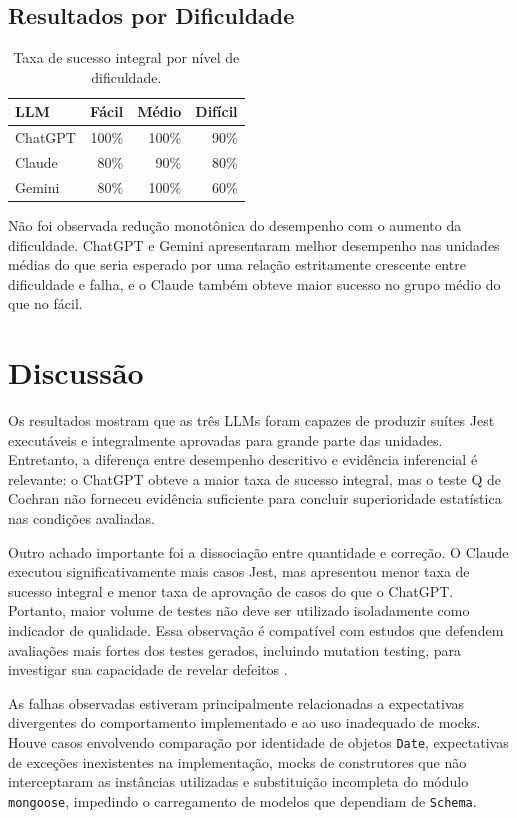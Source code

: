 \documentclass[12pt]{article}
\begin{document}
\subsection{Resultados por Dificuldade}

\begin{table}[H]
\centering
\caption{Taxa de sucesso integral por nível de dificuldade.}
\label{tab:dificuldade}
\begin{tabular}{lrrr}
\toprule
LLM & Fácil & Médio & Difícil \\
\midrule
ChatGPT & 100\% & 100\% & 90\% \\
Claude   & 80\%  & 90\%  & 80\% \\
Gemini   & 80\%  & 100\% & 60\% \\
\bottomrule
\end{tabular}
\end{table}

Não foi observada redução monotônica do desempenho com o aumento da dificuldade. ChatGPT e Gemini apresentaram melhor desempenho nas unidades médias do que seria esperado por uma relação estritamente crescente entre dificuldade e falha, e o Claude também obteve maior sucesso no grupo médio do que no fácil.

\section{Discussão}

Os resultados mostram que as três LLMs foram capazes de produzir suítes Jest executáveis e integralmente aprovadas para grande parte das unidades. Entretanto, a diferença entre desempenho descritivo e evidência inferencial é relevante: o ChatGPT obteve a maior taxa de sucesso integral, mas o teste Q de Cochran não forneceu evidência suficiente para concluir superioridade estatística nas condições avaliadas.

Outro achado importante foi a dissociação entre quantidade e correção. O Claude executou significativamente mais casos Jest, mas apresentou menor taxa de sucesso integral e menor taxa de aprovação de casos do que o ChatGPT. Portanto, maior volume de testes não deve ser utilizado isoladamente como indicador de qualidade. Essa observação é compatível com estudos que defendem avaliações mais fortes dos testes gerados, incluindo mutation testing, para investigar sua capacidade de revelar defeitos \cite{dakhel2024mutap}.

As falhas observadas estiveram principalmente relacionadas a expectativas divergentes do comportamento implementado e ao uso inadequado de mocks. Houve casos envolvendo comparação por identidade de objetos \texttt{Date}, expectativas de exceções inexistentes na implementação, mocks de construtores que não interceptaram as instâncias utilizadas e substituição incompleta do módulo \texttt{mongoose}, impedindo o carregamento de modelos que dependiam de \texttt{Schema}.
\end{document}
